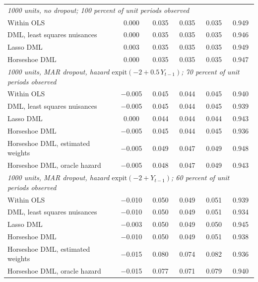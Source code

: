 \begin{table}[ht]
\begin{tabular}{lccccc}
\midrule
\multicolumn{6}{l}{\emph{1000 units, no dropout; 100 percent of unit periods observed}} \\
Within OLS & 0.000 & 0.035 & 0.035 & 0.035 & 0.949 \\
DML, least squares nuisances & 0.000 & 0.035 & 0.035 & 0.035 & 0.946 \\
Lasso DML & 0.003 & 0.035 & 0.035 & 0.035 & 0.949 \\
Horseshoe DML & 0.000 & 0.035 & 0.035 & 0.035 & 0.947 \\
\midrule
\multicolumn{6}{l}{\emph{1000 units, MAR dropout, hazard $\mathrm{expit}(-2 + 0.5\,Y_{t-1})$; 70 percent of unit periods observed}} \\
Within OLS & $-$0.005 & 0.045 & 0.044 & 0.045 & 0.940 \\
DML, least squares nuisances & $-$0.005 & 0.045 & 0.044 & 0.045 & 0.939 \\
Lasso DML & 0.000 & 0.044 & 0.044 & 0.044 & 0.943 \\
Horseshoe DML & $-$0.005 & 0.045 & 0.044 & 0.045 & 0.936 \\
Horseshoe DML, estimated weights & $-$0.005 & 0.049 & 0.047 & 0.049 & 0.948 \\
Horseshoe DML, oracle hazard & $-$0.005 & 0.048 & 0.047 & 0.049 & 0.943 \\
\midrule
\multicolumn{6}{l}{\emph{1000 units, MAR dropout, hazard $\mathrm{expit}(-2 + Y_{t-1})$; 60 percent of unit periods observed}} \\
Within OLS & $-$0.010 & 0.050 & 0.049 & 0.051 & 0.939 \\
DML, least squares nuisances & $-$0.010 & 0.050 & 0.049 & 0.051 & 0.934 \\
Lasso DML & $-$0.003 & 0.050 & 0.049 & 0.050 & 0.945 \\
Horseshoe DML & $-$0.010 & 0.050 & 0.049 & 0.051 & 0.938 \\
Horseshoe DML, estimated weights & $-$0.015 & 0.080 & 0.074 & 0.082 & 0.936 \\
Horseshoe DML, oracle hazard & $-$0.015 & 0.077 & 0.071 & 0.079 & 0.940 \\
\bottomrule
\end{tabular}
\end{table}
